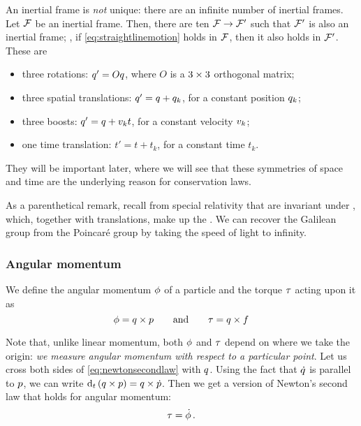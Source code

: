 An inertial frame is \emph{not} unique: there are an infinite number of inertial frames. Let $\mathcal{F}$ be an inertial frame. Then, there are ten  $\mathcal{F}\to\mathcal{F}'$ such that $\mathcal{F}'$ is also an inertial frame; \ie, if \cref{eq:straightlinemotion} holds in $\mathcal{F}$, then it also holds in $\mathcal{F}'$. These are
%
\begin{itemize}
%
\item three rotations: $q' = Oq$, where $O$ is a $3\times 3$ orthogonal matrix;
%
\item three spatial translations: $q' = q + q_k$, for a constant position $q_k$;
%
\item three boosts: $q' = q + v_k t$, for a constant velocity $v_k$;
%
\item one time translation: $t' = t + t_k$, for a constant time $t_k$.
%
\end{itemize}
%
%
%
They will be important later, where we will see that these symmetries of space and time are the underlying reason for conservation laws. 

As a parenthetical remark, recall from special relativity that  are invariant under , which, together with translations, make up the . We can recover the Galilean group from the Poincaré group by taking the speed of light to infinity.


\subsubsection{Angular momentum}
%
We define the angular momentum $\phi$ of a particle and the torque $\tau$ acting upon it as
%
\begin{equation}\label{eq:amomandtork}
  \phi = q\times p 
  \qquad\text{and}\qquad
  \tau = q\times f
\end{equation}

Note that, unlike linear momentum, both $\phi$ and $\tau$ depend on where we take the origin: \emph{we measure angular momentum with respect to a particular point}. Let us cross both sides of \cref{eq:newtonsecondlaw} with $q$. Using the fact that $\dot{q}$ is parallel to $p$, we can write $\text{d}_{t}\left({q\times p}\right) = q\times\dot{p}$. Then we get a version of Newton's second law that holds for angular momentum:
%
\begin{equation}\label{eq:angularnewtonsecondlaw}
  \tau = \dot{\phi}\,.
\end{equation}



